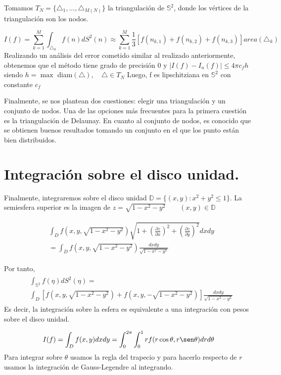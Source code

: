 \medskip
Tomamos $T_N=\{\triangle_1,...,\triangle_{M(N)}\}$ la triangulación de $\mathds{S}^2$, donde los vértices de la triangulación son los nodos.

$$
I(f) = \sum_{k=1}^{M} \int_{\triangle_k} f(n)dS^2(n) \approx  \sum_{k=1}^{M} \frac{1}{3}[f(n_{k,1})+f(n_{k,2})+f(n_{k,3})] area(\triangle_k)
$$
Realizando un análisis del error cometido similar al realizado anteriormente, obtenemos que el método tiene grado de precisión 0 y 
$|I(f)-I_n(f)|\le 4\pi c_f h$ siendo $h=\max$ diam$(\triangle), \quad \triangle\in T_N$
Luego, f es lipschitziana en $\mathds{S}^2$ con constante $ c_f$

Finalmente, se nos plantean dos cuestiones: elegir una triangulación y un conjunto de nodos. Una de las opciones más frecuentes para la primera cuestión es la triangulación de Delaunay. En cuanto al conjunto de nodos, es conocido que se obtienen buenos resultados tomando un conjunto en el que los punto están bien distribuidos.

\section{Integración sobre el disco unidad.}
Finalmente, integraremos sobre el disco unidad $\mathds{D}=\{(x,y):x^2+y^2 \le 1\}.$
La semiesfera superior es la imagen de 
$z=\sqrt{1-x^2-y^2} \qquad (x,y)\in \mathds{D}$

\begin{gather*}
\begin{aligned}
&\int_{D}f(x,y,\sqrt{1-x^2-y^2})\sqrt{1+(\frac{\partial z}{\partial x})^2+(\frac{\partial z}{\partial y})^2} dx dy \\ 
&= \int_D f(x,y,\sqrt{1-x^2-y^2})\frac{dx dy}{\sqrt{1-x^2-y^2}}
\end{aligned}
\end{gather*}
	
Por tanto,
\begin{gather*}
\begin{aligned}
&\int_{\mathds{S}^2}f(\eta) dS^2(\eta)  =\\ &\int_D \left[f(x,y,\sqrt{1-x^2-y^2})+f(x,y,-\sqrt{1-x^2-y^2})\right]\frac{dx dy}{\sqrt{1-x^2-y^2}}
\end{aligned}
\end{gather*}  
Es decir, la integración sobre la esfera es equivalente a una integración con pesos sobre el disco unidad.


$$I(f)=\int_{D} f(x,y) dxdy = \int_{0}^{2\pi}\int_{0}^{1} rf(r\cos\theta,r\sen\theta)drd\theta $$
Para integrar sobre $\theta$ usamos la regla del trapecio y para hacerlo respecto de $r$ usamos la integración de Gauss-Legendre al integrando.

